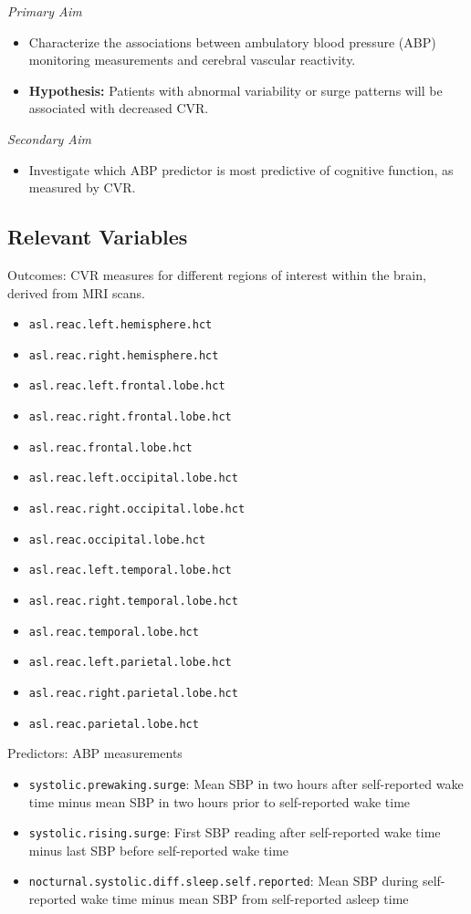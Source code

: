\documentclass[10pt]{article}\usepackage[]{graphicx}\usepackage[]{color}
\begin{document}
{\it Primary Aim}
\begin{itemize}
  \item Characterize the associations between ambulatory blood pressure (ABP) monitoring measurements and cerebral vascular reactivity.
  \item {\bf Hypothesis:} Patients with abnormal variability or surge patterns will be associated with decreased CVR.
\end{itemize}

{\it Secondary Aim}
\begin{itemize}
\item Investigate which ABP predictor is most predictive of cognitive function, as measured by CVR.
\end{itemize}

\subsection{Relevant Variables}
\label{sec:vars}
Outcomes: CVR measures for different regions of interest within the brain, derived from MRI scans.\\
\begin{itemize}
  \item \texttt{asl.reac.left.hemisphere.hct}
  \item \texttt{asl.reac.right.hemisphere.hct}
  \item \texttt{asl.reac.left.frontal.lobe.hct}
  \item \texttt{asl.reac.right.frontal.lobe.hct}
  \item \texttt{asl.reac.frontal.lobe.hct}
  \item \texttt{asl.reac.left.occipital.lobe.hct}
  \item \texttt{asl.reac.right.occipital.lobe.hct}
  \item \texttt{asl.reac.occipital.lobe.hct}
  \item \texttt{asl.reac.left.temporal.lobe.hct}
  \item \texttt{asl.reac.right.temporal.lobe.hct}
  \item \texttt{asl.reac.temporal.lobe.hct}
  \item \texttt{asl.reac.left.parietal.lobe.hct}
  \item \texttt{asl.reac.right.parietal.lobe.hct}
  \item \texttt{asl.reac.parietal.lobe.hct}
\end{itemize}

Predictors: ABP measurements 
\begin{itemize}
  \item \texttt{systolic.prewaking.surge}: Mean SBP in two hours after self-reported wake time minus mean SBP in two hours prior to self-reported wake time 
  \item \texttt{systolic.rising.surge}: First SBP reading after self-reported wake time minus last SBP before self-reported wake time
  \item \texttt{nocturnal.systolic.diff.sleep.self.reported}: Mean SBP during self-reported wake time minus mean SBP from self-reported asleep time
\end{itemize}
\end{document}
